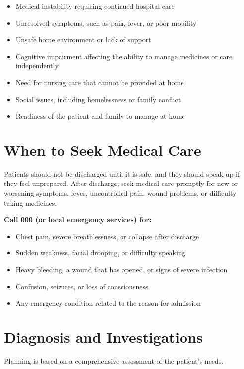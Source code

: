 \begin{itemize}
    \item Medical instability requiring continued hospital care
    \item Unresolved symptoms, such as pain, fever, or poor mobility
    \item Unsafe home environment or lack of support
    \item Cognitive impairment affecting the ability to manage medicines or care independently
    \item Need for nursing care that cannot be provided at home
    \item Social issues, including homelessness or family conflict
    \item Readiness of the patient and family to manage at home
\end{itemize}

\section*{When to Seek Medical Care}
Patients should not be discharged until it is safe, and they should speak up if they feel unprepared. After discharge, seek medical care promptly for new or worsening symptoms, fever, uncontrolled pain, wound problems, or difficulty taking medicines.

\textbf{Call 000 (or local emergency services) for:}
\begin{itemize}
    \item Chest pain, severe breathlessness, or collapse after discharge
    \item Sudden weakness, facial drooping, or difficulty speaking
    \item Heavy bleeding, a wound that has opened, or signs of severe infection
    \item Confusion, seizures, or loss of consciousness
    \item Any emergency condition related to the reason for admission
\end{itemize}

\section*{Diagnosis and Investigations}
Planning is based on a comprehensive assessment of the patient's needs.

